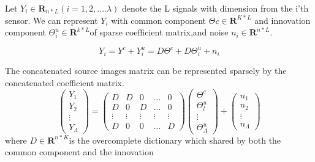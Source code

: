 Let  \({Y}_{i} \in {\textbf{R}}_{n*L} \left(i=1,2,....\lambda \right) \) denote the L signals with dimension from the i’th sensor. We can represent \({Y}_{i}\) with common component \(\Theta c \in {\textbf{R}}^{K*L} \) and innovation component \(\Theta_{i}^{u} \in {\textbf{R}}^{k*L}  \)of sparse coefficient matrix,and noise \({n}_{i} \in {\textbf{R}}^{n*L} \).

\begin{equation}
{Y}_{i}={Y}^{c}+Y_{i}^{u}=D{\Theta}^{c}+D\Theta_{i}^{u}+{n}_{i}
\end{equation} 

\hfill \break The concatenated source images matrix can be represented sparsely by the concatenated coefficient matrix.
\begin{equation}\label{eq:3.2}
\begin{pmatrix}
{Y}_{1}  \\ 
{Y}_{2}\\ 
\vdots\\
{Y}_{\Lambda }
\end{pmatrix}=\begin{pmatrix}
D & D & 0 & \dots{} &0 \\ 
 D& 0 &D  & \dots{} & 0 \\ 
 \vdots{}& \vdots{}  &  \vdots{} & \vdots{}  & \vdots{} \\ 
 D& 0 & 0 & \dots{} & D 
\end{pmatrix}\begin{pmatrix}
{\Theta }^{c}\\ 
\Theta _{l}^{u}\\ 
 \vdots{}      \\ 
\Theta _{\Lambda }^{u}
\end{pmatrix}+\begin{pmatrix}
{n}_{1} \\ 
{n}_{2} \\ 
\vdots{} \\ 
{n}_{\Lambda }
\end{pmatrix}
\end{equation}
where \(D \in {\textbf{R}}^{n*K} \)is the overcomplete dictionary which shared by both the common component and the innovation
